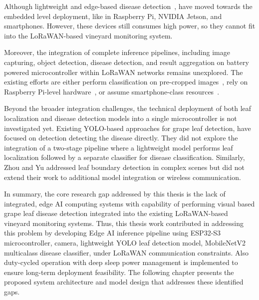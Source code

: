 Although lightweight and edge-based disease detection~\cite{karim2024enhancing, lazcano2025deep, deepa2026net}, have moved towards the embedded level deployment, like in Raspberry Pi, NVIDIA Jetson, and smartphones. However, these devices still consumes high power, so they cannot fit into the LoRaWAN-based vineyard monitoring system.



Moreover, the integration of complete inference pipelines, including image capturing, object detection, disease detection, and result aggregation on battery powered microcontroller within LoRaWAN networks remains unexplored. The existing efforts are either perform classification on pre-cropped images~\cite{kirubakaran2024grape}, rely on Raspberry Pi-level hardware~\cite{tao2025icrop+}, or assume smartphone-class resources~\cite{mamun2025grape}.

Beyond the broader integration challenges, the technical deployment of both leaf localization and  disease detection models into a single microcontroller is not investigated yet. Existing YOLO-based approaches for grape leaf detection\cite{yang2024detection, chen2024yolov8, ji2025research}, have focused on detection detecting the disease directly. They did not explore the integration of a two-stage pipeline where a lightweight model performs leaf localization followed by a separate classifier for disease classification. Similarly, Zhou and Yu\cite{zhou2025lightweight} addressed leaf boundary detection in complex scenes but did not extend their work to additional model integration or wireless communication.



In summary, the core research gap addressed by this thesis is the lack of integrated, edge AI computing systems with capability of performing visual based grape leaf disease detection integrated into the existing LoRaWAN-based vineyard monitoring systems. Thus, this thesis work contributed in addressing this problem by developing Edge AI inference pipeline using ESP32-S3 microcontroller, camera, lightweight YOLO leaf detection model, MobileNetV2 multicalass disease classifier, under LoRaWAN communication constraints. Also duty-cycled operation with deep sleep power management is implemented to ensure long-term deployment feasibility. The following chapter presents the proposed system architecture and model design that addresses these identified gaps.



